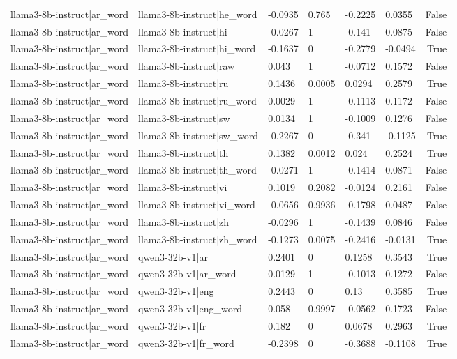 \begin{table}
\begin{tabular}{llllllr}
llama3-8b-instruct|ar_word & llama3-8b-instruct|he_word & -0.0935 & 0.765 & -0.2225 & 0.0355 & False \\
llama3-8b-instruct|ar_word & llama3-8b-instruct|hi & -0.0267 & 1 & -0.141 & 0.0875 & False \\
llama3-8b-instruct|ar_word & llama3-8b-instruct|hi_word & -0.1637 & 0 & -0.2779 & -0.0494 & True \\
llama3-8b-instruct|ar_word & llama3-8b-instruct|raw & 0.043 & 1 & -0.0712 & 0.1572 & False \\
llama3-8b-instruct|ar_word & llama3-8b-instruct|ru & 0.1436 & 0.0005 & 0.0294 & 0.2579 & True \\
llama3-8b-instruct|ar_word & llama3-8b-instruct|ru_word & 0.0029 & 1 & -0.1113 & 0.1172 & False \\
llama3-8b-instruct|ar_word & llama3-8b-instruct|sw & 0.0134 & 1 & -0.1009 & 0.1276 & False \\
llama3-8b-instruct|ar_word & llama3-8b-instruct|sw_word & -0.2267 & 0 & -0.341 & -0.1125 & True \\
llama3-8b-instruct|ar_word & llama3-8b-instruct|th & 0.1382 & 0.0012 & 0.024 & 0.2524 & True \\
llama3-8b-instruct|ar_word & llama3-8b-instruct|th_word & -0.0271 & 1 & -0.1414 & 0.0871 & False \\
llama3-8b-instruct|ar_word & llama3-8b-instruct|vi & 0.1019 & 0.2082 & -0.0124 & 0.2161 & False \\
llama3-8b-instruct|ar_word & llama3-8b-instruct|vi_word & -0.0656 & 0.9936 & -0.1798 & 0.0487 & False \\
llama3-8b-instruct|ar_word & llama3-8b-instruct|zh & -0.0296 & 1 & -0.1439 & 0.0846 & False \\
llama3-8b-instruct|ar_word & llama3-8b-instruct|zh_word & -0.1273 & 0.0075 & -0.2416 & -0.0131 & True \\
llama3-8b-instruct|ar_word & qwen3-32b-v1|ar & 0.2401 & 0 & 0.1258 & 0.3543 & True \\
llama3-8b-instruct|ar_word & qwen3-32b-v1|ar_word & 0.0129 & 1 & -0.1013 & 0.1272 & False \\
llama3-8b-instruct|ar_word & qwen3-32b-v1|eng & 0.2443 & 0 & 0.13 & 0.3585 & True \\
llama3-8b-instruct|ar_word & qwen3-32b-v1|eng_word & 0.058 & 0.9997 & -0.0562 & 0.1723 & False \\
llama3-8b-instruct|ar_word & qwen3-32b-v1|fr & 0.182 & 0 & 0.0678 & 0.2963 & True \\
llama3-8b-instruct|ar_word & qwen3-32b-v1|fr_word & -0.2398 & 0 & -0.3688 & -0.1108 & True \\

\end{tabular}
\end{table}
